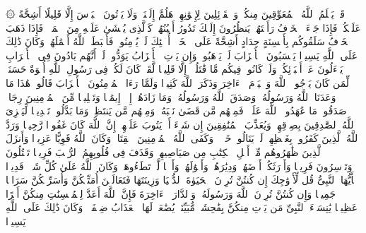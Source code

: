 \startbuffer[\q:33:18]
۞ قَدۡ یَعۡلَمُ ٱللَّهُ ٱلۡمُعَوِّقِینَ مِنكُمۡ وَٱلۡقَاۤئِلِینَ لِإِخۡوَٰنِهِمۡ هَلُمَّ إِلَیۡنَاۖ وَلَا یَأۡتُونَ ٱلۡبَأۡسَ إِلَّا قَلِیلًا%
\stopbuffer
\startbuffer[\q:33:19]
أَشِحَّةً عَلَیۡكُمۡۖ فَإِذَا جَاۤءَ ٱلۡخَوۡفُ رَأَیۡتَهُمۡ یَنظُرُونَ إِلَیۡكَ تَدُورُ أَعۡیُنُهُمۡ كَٱلَّذِی یُغۡشَىٰ عَلَیۡهِ مِنَ ٱلۡمَوۡتِۖ فَإِذَا ذَهَبَ ٱلۡخَوۡفُ سَلَقُوكُم بِأَلۡسِنَةٍ حِدَادٍ أَشِحَّةً عَلَى ٱلۡخَیۡرِۚ أُو۟لَٰۤئِكَ لَمۡ یُؤۡمِنُوا۟ فَأَحۡبَطَ ٱللَّهُ أَعۡمَٰلَهُمۡۚ وَكَانَ ذَٰلِكَ عَلَى ٱللَّهِ یَسِیرࣰا%
\stopbuffer
\startbuffer[\q:33:20]
یَحۡسَبُونَ ٱلۡأَحۡزَابَ لَمۡ یَذۡهَبُوا۟ۖ وَإِن یَأۡتِ ٱلۡأَحۡزَابُ یَوَدُّوا۟ لَوۡ أَنَّهُم بَادُونَ فِی ٱلۡأَعۡرَابِ یَسۡءَلُونَ عَنۡ أَنۢبَاۤئِكُمۡۖ وَلَوۡ كَانُوا۟ فِیكُم مَّا قَٰتَلُوۤا۟ إِلَّا قَلِیلࣰا%
\stopbuffer
\startbuffer[\q:33:21]
لَّقَدۡ كَانَ لَكُمۡ فِی رَسُولِ ٱللَّهِ أُسۡوَةٌ حَسَنَةࣱ لِّمَن كَانَ یَرۡجُوا۟ ٱللَّهَ وَٱلۡیَوۡمَ ٱلۡءَاخِرَ وَذَكَرَ ٱللَّهَ كَثِیرࣰا%
\stopbuffer
\startbuffer[\q:33:22]
وَلَمَّا رَءَا ٱلۡمُؤۡمِنُونَ ٱلۡأَحۡزَابَ قَالُوا۟ هَٰذَا مَا وَعَدَنَا ٱللَّهُ وَرَسُولُهُۥ وَصَدَقَ ٱللَّهُ وَرَسُولُهُۥۚ وَمَا زَادَهُمۡ إِلَّاۤ إِیمَٰنࣰا وَتَسۡلِیمࣰا%
\stopbuffer
\startbuffer[\q:33:23]
مِّنَ ٱلۡمُؤۡمِنِینَ رِجَالࣱ صَدَقُوا۟ مَا عَٰهَدُوا۟ ٱللَّهَ عَلَیۡهِۖ فَمِنۡهُم مَّن قَضَىٰ نَحۡبَهُۥ وَمِنۡهُم مَّن یَنتَظِرُۖ وَمَا بَدَّلُوا۟ تَبۡدِیلࣰا%
\stopbuffer
\startbuffer[\q:33:24]
لِّیَجۡزِیَ ٱللَّهُ ٱلصَّٰدِقِینَ بِصِدۡقِهِمۡ وَیُعَذِّبَ ٱلۡمُنَٰفِقِینَ إِن شَاۤءَ أَوۡ یَتُوبَ عَلَیۡهِمۡۚ إِنَّ ٱللَّهَ كَانَ غَفُورࣰا رَّحِیمࣰا%
\stopbuffer
\startbuffer[\q:33:25]
وَرَدَّ ٱللَّهُ ٱلَّذِینَ كَفَرُوا۟ بِغَیۡظِهِمۡ لَمۡ یَنَالُوا۟ خَیۡرࣰاۚ وَكَفَى ٱللَّهُ ٱلۡمُؤۡمِنِینَ ٱلۡقِتَالَۚ وَكَانَ ٱللَّهُ قَوِیًّا عَزِیزࣰا%
\stopbuffer
\startbuffer[\q:33:26]
وَأَنزَلَ ٱلَّذِینَ ظَٰهَرُوهُم مِّنۡ أَهۡلِ ٱلۡكِتَٰبِ مِن صَیَاصِیهِمۡ وَقَذَفَ فِی قُلُوبِهِمُ ٱلرُّعۡبَ فَرِیقࣰا تَقۡتُلُونَ وَتَأۡسِرُونَ فَرِیقࣰا%
\stopbuffer
\startbuffer[\q:33:27]
وَأَوۡرَثَكُمۡ أَرۡضَهُمۡ وَدِیَٰرَهُمۡ وَأَمۡوَٰلَهُمۡ وَأَرۡضࣰا لَّمۡ تَطَءُوهَاۚ وَكَانَ ٱللَّهُ عَلَىٰ كُلِّ شَیۡءࣲ قَدِیرࣰا%
\stopbuffer
\startbuffer[\q:33:28]
یَٰۤأَیُّهَا ٱلنَّبِیُّ قُل لِّأَزۡوَٰجِكَ إِن كُنتُنَّ تُرِدۡنَ ٱلۡحَیَوٰةَ ٱلدُّنۡیَا وَزِینَتَهَا فَتَعَالَیۡنَ أُمَتِّعۡكُنَّ وَأُسَرِّحۡكُنَّ سَرَاحࣰا جَمِیلࣰا%
\stopbuffer
\startbuffer[\q:33:29]
وَإِن كُنتُنَّ تُرِدۡنَ ٱللَّهَ وَرَسُولَهُۥ وَٱلدَّارَ ٱلۡءَاخِرَةَ فَإِنَّ ٱللَّهَ أَعَدَّ لِلۡمُحۡسِنَٰتِ مِنكُنَّ أَجۡرًا عَظِیمࣰا%
\stopbuffer
\startbuffer[\q:33:30]
یَٰنِسَاۤءَ ٱلنَّبِیِّ مَن یَأۡتِ مِنكُنَّ بِفَٰحِشَةࣲ مُّبَیِّنَةࣲ یُضَٰعَفۡ لَهَا ٱلۡعَذَابُ ضِعۡفَیۡنِۚ وَكَانَ ذَٰلِكَ عَلَى ٱللَّهِ یَسِیرࣰا%
